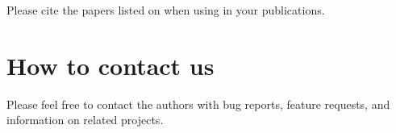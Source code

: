 Please cite the papers listed on \wingjUrl when using \wingj in your publications.

\section{How to contact us}
Please feel free to contact the authors with bug reports, feature requests, and information on related projects.


